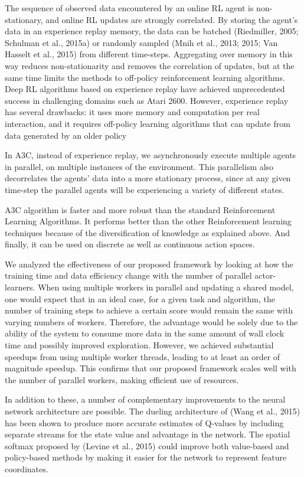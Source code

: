 \documentclass[conference]{IEEEtran}
\begin{document}
The sequence of observed data encountered by an online RL agent is non-stationary, and online RL updates are strongly correlated. By storing the agent’s data in an experience replay memory, the data can be batched (Riedmiller, 2005; Schulman et al., 2015a) or randomly sampled (Mnih et al., 2013; 2015; Van Hasselt et al., 2015) from different time-steps. Aggregating over memory in this way reduces non-stationarity and removes the correlation of updates, but at the same time limits the methods to off-policy reinforcement learning algorithms. Deep RL algorithms based on experience replay have achieved unprecedented success in challenging domains such as Atari 2600. However, experience replay has several drawbacks: it uses more memory and computation per real interaction, and it requires off-policy learning algorithms that can update from data generated by an older policy

In A3C, instead of experience replay, we asynchronously execute multiple agents in parallel, on multiple instances of the environment. This parallelism also decorrelates the agents’ data into a more stationary process, since at any given time-step the parallel agents will be experiencing a variety of different states.

A3C algorithm is faster and more robust than the standard Reinforcement Learning Algorithms. It performs better than the other Reinforcement learning techniques because of the diversification of knowledge as explained above. And finally, it can be used on discrete as well as continuous action spaces.

We analyzed the effectiveness of our proposed framework by looking at how the training time and data efficiency change with the number of parallel actor-learners. When using multiple workers in parallel and updating a shared model, one would expect that in an ideal case, for a given task and algorithm, the number of training steps to achieve a certain score would remain the same with varying numbers of workers. Therefore, the advantage would be solely due to the ability of the system to consume more data in the same amount of wall clock time and possibly improved exploration. However, we achieved substantial speedups from using multiple worker threads, leading to at least an order of magnitude speedup. This confirms that our proposed framework scales well with the number of parallel workers, making efficient use of resources.

In addition to these, a number of complementary improvements to the neural network architecture are possible. The dueling architecture of (Wang et al., 2015) has been shown to produce more accurate estimates of Q-values by including separate streams for the state value and advantage in the network. The spatial softmax proposed by (Levine et al., 2015) could improve both value-based and policy-based methods by making it easier for the network to represent feature coordinates.
\end{document}
